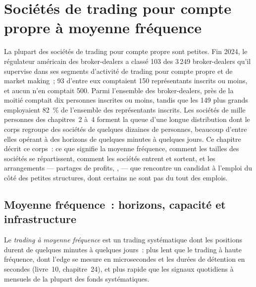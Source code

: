 \chapter{Sociétés de trading pour compte propre à moyenne fréquence}\label{ch:in:medium-frequency-proprietary-shops}

La plupart des sociétés de trading pour compte propre sont petites. Fin 2024, le régulateur américain des broker-dealers a classé 103 des 3\,249
broker-dealers qu'il supervise dans ses segments d'activité de trading pour compte propre et de market making~; 93 d'entre eux comptaient 150
représentants inscrits ou moins, et aucun n'en comptait 500. Parmi l'ensemble des broker-dealers, près de la moitié comptait dix personnes inscrites
ou moins, tandis que les 149 plus grands employaient 82~\% de l'ensemble des représentants inscrits. Les sociétés de mille personnes des
chapitres~2 à~4 forment la queue d'une longue distribution dont le corps regroupe des sociétés de quelques dizaines de personnes, beaucoup d'entre elles opérant
à des horizons de quelques minutes à quelques jours. Ce chapitre décrit ce corps~: ce que signifie la moyenne fréquence, comment les tailles des sociétés
se répartissent, comment les sociétés entrent et sortent, et les arrangements --- partages de profits, ,  --- que
rencontre un candidat à l'emploi du côté des petites structures, dont certains ne sont pas du tout des emplois.

\section{Moyenne fréquence~: horizons, capacité et infrastructure}

\begin{definition}\label{def:in:medium-frequency-proprietary-shops:mft}
Le \emph{trading à moyenne fréquence} est un trading systématique dont les positions durent de quelques minutes à
quelques jours~: plus lent que le trading à haute fréquence, dont l'edge se mesure en microsecondes et les durées de détention en secondes
(livre~10, chapitre~24), et plus rapide que les signaux quotidiens à mensuels de la plupart des fonds systématiques.
\end{definition}


